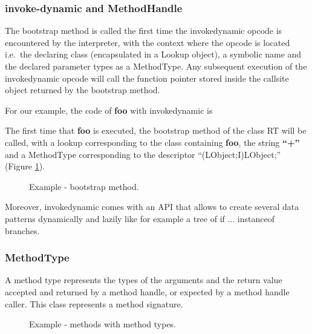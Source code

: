 \documentclass{sig-alternate}
\begin{document}
    \subsubsection{invoke-dynamic and MethodHandle}

      The bootstrap method is called the first time the invokedynamic opcode is encountered by the interpreter,
      with the context where the opcode is located i.e.~the declaring class (encapsulated in a Lookup object),
      a symbolic name and the declared parameter types as a MethodType.
      Any subsequent execution of the invokedynamic opcode will call the function pointer
      stored inside the callsite object returned by the bootstrap method.
      
      For our example, the code of {\bf foo} with invokedynamic is

      

      The first time that {\bf foo} is executed, the bootstrap method of the class RT will be called, with a lookup corresponding to the class containing {\bf foo},
      the string {\bf ``+''} and a MethodType corresponding to the descriptor ``(LObject;I)LObject;'' (Figure \ref{fooBSM}).

      \begin{figure}[!h]
        \centering \vspace{-1.5em}
        \caption{Example - bootstrap method.}
        \label{fooBSM}
      \end{figure}

      Moreover, invokedynamic comes with an API that allows to create several data patterns
      dynamically and lazily like for example a tree of if ... instanceof branches.

    \subsubsection{MethodType}

      A method type represents the types of the arguments and the return value accepted and returned by a method handle,
      or expected by a method handle caller.
      This class represents a method signature.

      \begin{figure}[!h]
        \centering \vspace{-1.5em}
        \caption{Example - methods with method types.}
        \label{fooMTS}
      \end{figure}
\end{document}
